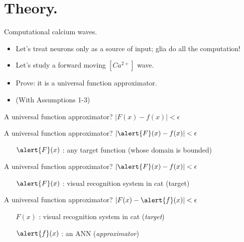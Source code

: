 \documentclass[10pt]{beamer}
\begin{document}
\section[In theory.]{Theory.}
\begin{frame}[fragile]{Computational calcium waves.}
\begin{itemize}
\item Let's treat neurons only as a source of input; glia do all the computation!
\item Let's study a forward moving $[Ca^{2+}]$ wave.
\item \alert{Prove}: it is a universal function approximator.
\item (With Assumptions 1-3)
\end{itemize}
\end{frame}

\begin{frame}[fragile]{A universal function approximator?}
$|F(x) - f(x)| < \epsilon$
\end{frame}

\begin{frame}[fragile]{A universal function approximator?}
$|\alert{F}(x) - f(x)| < \epsilon$
\begin{itemize}
    \item[$\alert{F}(x)$] : any target function (whose domain is bounded)
\end{itemize}
\end{frame}

\begin{frame}[fragile]{A universal function approximator?}
$|\alert{F}(x) - f(x)| < \epsilon$
\begin{itemize}
    \item[$\alert{F}(x)$] : visual recognition system in cat (target)
\end{itemize}
\end{frame}

\begin{frame}[fragile]{A universal function approximator?}
$|F(x) - \alert{f}(x)| < \epsilon$ 
\begin{itemize}
\item[$F(x)$] : visual recognition system in cat (\textit{target})\\
\item[$\alert{f}(x)$] : an ANN (\textit{approximator})
\end{itemize}
\end{frame}
\end{document}
